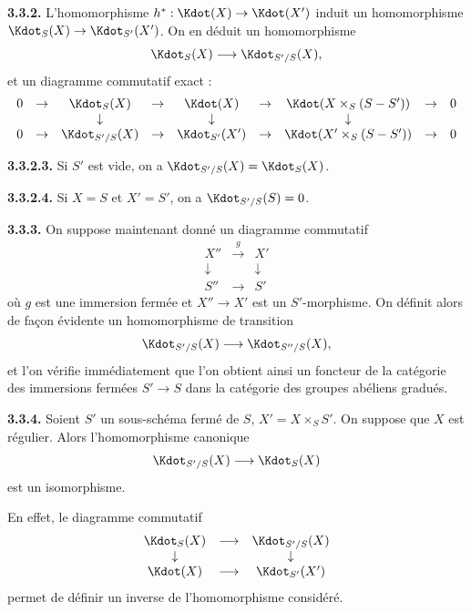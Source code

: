 \smallskip
\noindent\textbf{3.3.2.} L'homomorphisme $h^* : \Kdot(X) \to \Kdot(X')$ induit un homomorphisme $\Kdot_S(X) \to \Kdot_{S'}(X')$. On en d\'eduit un homomorphisme
\[
\Kdot_S(X) \longrightarrow \Kdot_{S'/S}(X),
\]
et un diagramme commutatif exact :
\[
\begin{array}{ccccccccc}
0 & \to & \Kdot_S(X) & \to & \Kdot(X) & \to & \Kdot(X \times_S (S - S')) & \to & 0 \\
  &     & \downarrow        &     & \downarrow        &     & \downarrow          &     &     \\
0 & \to & \Kdot_{S'/S}(X) & \to & \Kdot_{S'}(X') & \to & \Kdot(X' \times_S (S - S')) & \to & 0 \\
\end{array}
\]

\smallskip
\noindent\textbf{3.3.2.3.} Si $S'$ est vide, on a $\Kdot_{S'/S}(X) = \Kdot_S(X)$.

\smallskip
\noindent\textbf{3.3.2.4.} Si $X = S$ et $X' = S'$, on a $\Kdot_{S'/S}(S) = 0$.

\smallskip
\noindent\textbf{3.3.3.} On suppose maintenant donn\'e un diagramme commutatif
\[
\begin{array}{ccc}
X'' & \xrightarrow{g} & X' \\
\downarrow & & \downarrow \\
S'' & \xrightarrow{} & S'
\end{array}
\]
o\`u $g$ est une immersion ferm\'ee et $X'' \to X'$ est un $S'$-morphisme. On d\'efinit alors de fa\c con \'evidente un homomorphisme de transition
\[
\Kdot_{S'/S}(X) \longrightarrow \Kdot_{S''/S}(X),
\]
et l'on v\'erifie imm\'ediatement que l'on obtient ainsi un foncteur de la cat\'egorie des immersions ferm\'ees $S' \to S$ dans la cat\'egorie des groupes ab\'eliens gradu\'es.

\smallskip
\noindent\textbf{3.3.4.} Soient $S'$ un sous-sch\'ema ferm\'e de $S$, $X' = X \times_S S'$. On suppose que $X$ est r\'egulier. Alors l'homomorphisme canonique
\[
\Kdot_{S'/S}(X) \longrightarrow \Kdot_S(X)
\]
est un isomorphisme.

En effet, le diagramme commutatif
\[
\begin{array}{ccc}
\Kdot_S(X) & \longrightarrow & \Kdot_{S'/S}(X) \\
\downarrow & & \downarrow \\
\Kdot(X) & \longrightarrow & \Kdot_{S'}(X')
\end{array}
\]
permet de d\'efinir un inverse de l'homomorphisme consid\'er\'e.

